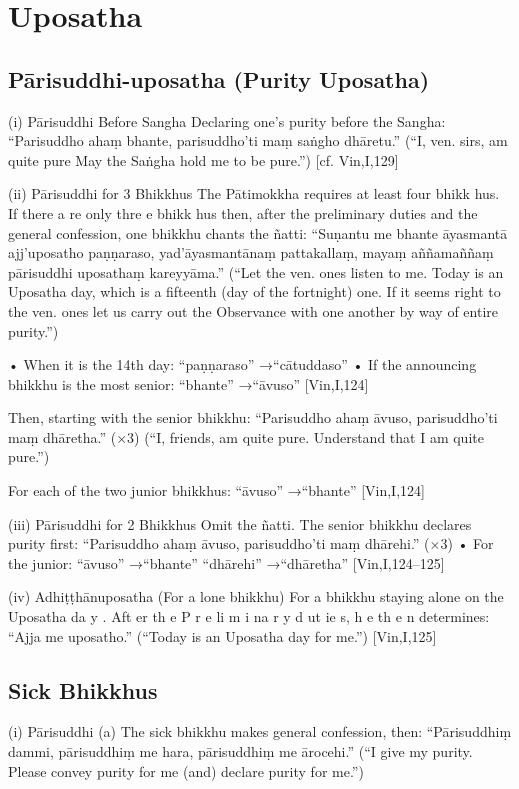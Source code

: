 \chapter{Uposatha}

\section{Pārisuddhi-uposatha (Purity Uposatha)}

(i) Pārisuddhi Before Sangha
Declaring one’s purity before the Sangha:
“Parisuddho ahaṃ bhante,
parisuddho’ti maṃ saṅgho dhāretu.”
(“I, ven. sirs, am quite pure
May the Saṅgha hold me to be pure.”)
[cf. Vin,I,129]

(ii) Pārisuddhi for 3 Bhikkhus
The Pātimokkha requires at least four
bhikk hus. If there a re only thre e bhikk hus
then, after the preliminary duties and the general confession, one bhikkhu chants the ñatti:
“Suṇantu me bhante āyasmantā ajj’uposatho
paṇṇaraso, yad’āyasmantānaṃ pattakallaṃ,
mayaṃ aññamaññaṃ pārisuddhi uposathaṃ
kareyyāma.”
(“Let the ven. ones listen to me. Today is an Uposatha
day, which is a fifteenth (day of the fortnight) one. If
it seems right to the ven. ones let us carry out the
Observance with one another by way of entire purity.”)

• When it is the 14th day:
“paṇṇaraso” →“cātuddaso”
• If the announcing bhikkhu is the most senior:
“bhante” →“āvuso”
[Vin,I,124]

Then, starting with the senior bhikkhu:
“Parisuddho ahaṃ āvuso,
parisuddho’ti maṃ dhāretha.” (×3)
(“I, friends, am quite pure.
Understand that I am quite pure.”)

For each of the two junior bhikkhus:
“āvuso” →“bhante”
[Vin,I,124]

(iii) Pārisuddhi for 2 Bhikkhus
Omit the ñatti. The senior bhikkhu declares
purity first:
“Parisuddho ahaṃ āvuso,
parisuddho’ti maṃ dhārehi.” (×3)
• For the junior:
“āvuso” →“bhante”
“dhārehi” →“dhāretha”
[Vin,I,124–125]

(iv) Adhiṭṭhānuposatha (For a lone bhikkhu)
For a bhikkhu staying alone on the Uposatha
da y . Aft er th e P r e li m i na r y d ut ie s, h e th e n
determines:
“Ajja me uposatho.”
(“Today is an Uposatha day for me.”)
[Vin,I,125]

\section{Sick Bhikkhus}

(i) Pārisuddhi
(a) The sick bhikkhu makes general
confession, then:
“Pārisuddhiṃ dammi,
pārisuddhiṃ me hara,
pārisuddhiṃ me ārocehi.”
(“I give my purity. Please convey purity for me
(and) declare purity for me.”)

